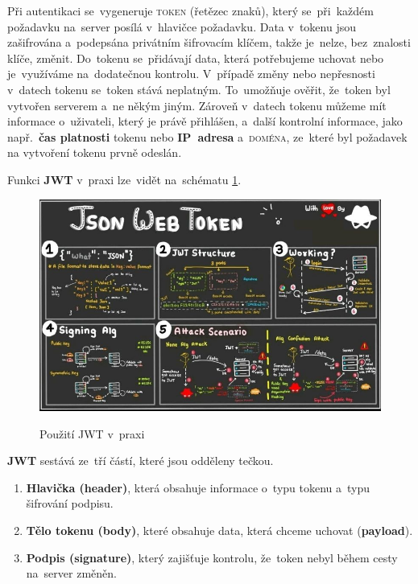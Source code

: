 \documentclass[14pt,a4paper]{article}
\begin{document}
            Při autentikaci se~vygeneruje \textsc{token} (řetězec znaků), který se~při~každém požadavku na~server posílá v~hlavičce požadavku. Data v~tokenu jsou zašifrována a~podepsána privátním šifrovacím klíčem, takže je~nelze, bez~znalosti klíče, změnit. Do~tokenu se~přidávají data, která potřebujeme uchovat nebo je~využíváme na~dodatečnou kontrolu. V~případě změny nebo nepřesnosti v~datech tokenu se~token stává neplatným. To~umožňuje ověřit, že~token byl vytvořen serverem a~ne někým jiným. Zároveň v~datech tokenu můžeme mít informace o~uživateli, který je právě přihlášen, a~další kontrolní informace, jako např.~\textbf{čas platnosti} tokenu nebo \textbf{IP~adresa} a~\textsc{doména}, ze~které byl požadavek na vytvoření tokenu prvně odeslán.

            Funkci \textbf{JWT} v~praxi lze~vidět na~schématu \ref{model-jwt}.

            \begin{figure}
                \centering
                \includegraphics[width=.8\linewidth]{img/jwt.jpg}
                \label{model-jwt}
                \caption{Použití JWT v~praxi}
            \end{figure}

            \textbf{JWT} sestává ze~tří částí, které jsou odděleny tečkou.
            
            \begin{enumerate}
                \item \textbf{Hlavička (header)}, která obsahuje informace o~typu tokenu a~typu šifrování podpisu.
                \item \textbf{Tělo tokenu (body)}, které obsahuje data, která chceme uchovat (\textbf{payload}).
                \item \textbf{Podpis (signature)}, který zajišťuje kontrolu, že~token nebyl během cesty na~server změněn.
            \end{enumerate}
\end{document}
